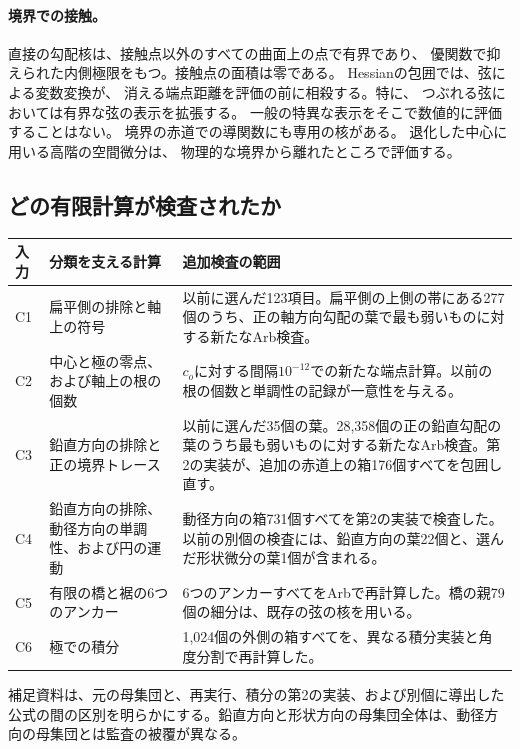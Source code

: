 \paragraph{境界での接触。}
直接の勾配核は、接触点以外のすべての曲面上の点で有界であり、
優関数で抑えられた内側極限をもつ。接触点の面積は零である。
Hessianの包囲では、弦による変数変換が、
消える端点距離を評価の前に相殺する。特に、
つぶれる弦においては有界な弦の表示を拡張する。
一般の特異な表示をそこで数値的に評価することはない。
境界の赤道での導関数にも専用の核がある。
退化した中心に用いる高階の空間微分は、
物理的な境界から離れたところで評価する。

\subsection{どの有限計算が検査されたか}
\label{subsec:computational-workload}
\begin{center}\small
\begin{tabularx}{\linewidth}{lXX}\toprule
入力 & 分類を支える計算 & 追加検査の範囲\\\midrule
C1 & 扁平側の排除と軸上の符号 & 以前に選んだ123項目。扁平側の上側の帯にある277個のうち、正の軸方向勾配の葉で最も弱いものに対する新たなArb検査。\\
C2 & 中心と極の零点、および軸上の根の個数 & $c_o$に対する間隔$10^{-12}$での新たな端点計算。以前の根の個数と単調性の記録が一意性を与える。\\
C3 & 鉛直方向の排除と正の境界トレース & 以前に選んだ35個の葉。28,358個の正の鉛直勾配の葉のうち最も弱いものに対する新たなArb検査。第2の実装が、追加の赤道上の箱176個すべてを包囲し直す。\\
C4 & 鉛直方向の排除、動径方向の単調性、および円の運動 & 動径方向の箱731個すべてを第2の実装で検査した。以前の別個の検査には、鉛直方向の葉22個と、選んだ形状微分の葉1個が含まれる。\\
C5 & 有限の橋と裾の6つのアンカー & 6つのアンカーすべてをArbで再計算した。橋の親79個の細分は、既存の弦の核を用いる。\\
C6 & 極での積分 & 1,024個の外側の箱すべてを、異なる積分実装と角度分割で再計算した。\\\bottomrule
\end{tabularx}\end{center}
補足資料は、元の母集団と、再実行、積分の第2の実装、および別個に導出した公式の間の区別を明らかにする。鉛直方向と形状方向の母集団全体は、動径方向の母集団とは監査の被覆が異なる。
